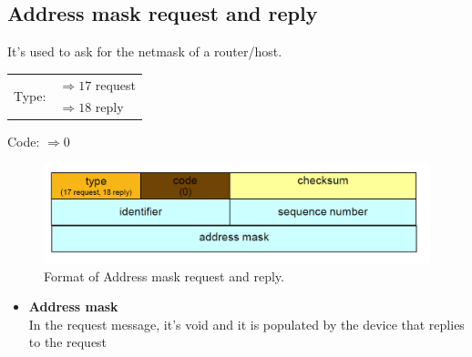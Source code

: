 \subsection{Address mask request and reply}
It's used to ask for the netmask of a router/host.
\begin{table}[H]
\centering \footnotesize
\begin{tabular}{c|l}
\multirow{2}{*}{Type:} & {$\Rightarrow 17$ request}\\
& {$\Rightarrow 18$ reply}\\
\end{tabular}
\end{table}
\begin{center}
Code: $\Rightarrow 0$\\
\end{center}
\begin{figure}[H]
\centering
\includegraphics[scale=0.35, angle=0]{./Images/ICMP/Address_mask}
\caption{\footnotesize{Format of Address mask request and reply.}}
\end{figure}
\begin{itemize}
\item{\textbf{Address mask}\\
In the request message, it's void and it is populated by the device that replies to the request
}
\end{itemize}

